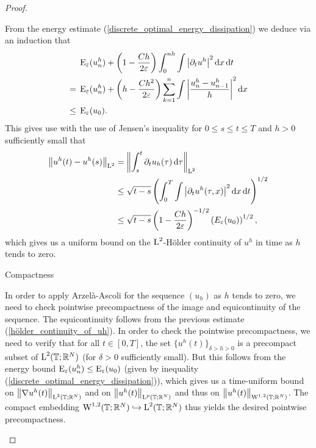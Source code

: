 \begin{proof}
\begin{description}[wide=0pt]
	From the energy estimate (\ref{discrete_optimal_energy_dissipation}) we deduce via an induction that
	\begin{align}
		& \operatorname{E}_{ \varepsilon } ( u_{ n }^{ h } )
		+
		\left(
			1
			-
			\frac{ C h  }{ 2 \varepsilon }
		\right)
		\int_{ 0 }^{ n h }
			\int
				\abs{ \partial_{ t } u^{ h } }^{ 2 }
			\dd{ x }
		\dd{ t }
		\notag
		\\
		={} &
		\operatorname{E}_{ \varepsilon } ( u_{ n }^{ h } )
		+
		\left(
			h - \frac{ C h^{ 2 }}{ 2 \varepsilon }
		\right)
		\sum_{k = 1 }^{ n }
			\int
				 \abs{
				 	\frac{ u_{ n }^{ h } - u_{ n - 1 }^{ h } }{ h }
			 	}^{ 2 }
		 	\dd{ x }
		 \notag
		\\
		\label{energy_and_time_derivative_bound}
		\leq {} &
		\operatorname{E}_{ \varepsilon } ( u_{ 0 } ).
	\end{align}
	This gives use with the use of Jensen's inequality for $ 0\leq s \leq t \leq T $ and $ h > 0 $ sufficiently small that
	\begin{align}
		\norm{ u^{ h } ( t ) - u^{ h } ( s ) }_{ \operatorname{L}^{ 2 } }
		& =
		\norm{ 
			\int_{ s }^{ t }
				\partial_{ t } u_{ h } ( \tau )
			\dd{ \tau }
		}_{ \operatorname{L}^{ 2 } }
		\notag
		\\
		& \leq
		\sqrt{ t - s }
		\left(	
			\int_{ 0 }^{ T }
					\int
						\abs{ \partial_{ t } u^{ h } ( \tau, x ) }^{ 2 }
					\dd{ x }
				\dd{ t }
		\right)^{ 1/2 }
		\notag
		\\
		\label{hölder_continuity_of_uh}
		& \leq
		\sqrt{ t - s }
		\left(
			1 - \frac{ C h }{ 2 \varepsilon }
		\right)^{ - 1/2 }
		\left(  E_{ \varepsilon } ( u_{ 0 } ) \right)^{ 1/ 2 },
	\end{align}
	which gives us a uniform bound on the $ \operatorname{L}^{ 2 }$-Hölder continuity of $ u^{ h } $ in time as $ h $ tends to zero.
	
	\item[Step 5:] Compactness
	
	In order to apply Arzelà-Ascoli for the sequence $ (u_{ h } ) $ as $ h $ tends to zero, we need to check pointwise precompactness of the image and equicontinuity of the sequence. 
	The equicontinuity follows from the previous estimate (\ref{hölder_continuity_of_uh}).
	In order to check the pointwise precompactness, we need to verify that for all $ t \in [ 0 , T ] $, the set
	$ \{ u^{ h } ( t ) \}_{ \delta > h > 0 } $ is a precompact subset of $ \operatorname{L}^{ 2 } ( \operatorname{\mathbb{T}} ; \mathbb{ R }^{ N } ) $ (for $ \delta > 0 $ sufficiently small). 
	But this follows from the energy bound $ \operatorname{E}_{ \varepsilon } ( u_{ n }^{ h } ) \leq \operatorname{E}_{ \varepsilon } ( u_{ 0 } ) $ (given by inequality (\ref{discrete_optimal_energy_dissipation})), which gives us a time-uniform bound on $ \norm{ \nabla u^{ h }( t ) }_{\operatorname{L}^{ 2 }( \operatorname{\mathbb{T}}; \mathbb{ R }^{ N } ) } $ and on $ \norm{ u^{ h } ( t )}_{ \operatorname{L}^{ p } ( \operatorname{\mathbb{T}}; \mathbb{ R }^{ N } ) } $ and thus on $ \norm{ u^{ h } ( t )}_{ \operatorname{W}^{ 1 , 2 } ( \operatorname{\mathbb{T}}; \mathbb{ R }^{ N } ) } $. The compact embedding
	$ \operatorname{W}^{ 1 , 2 } ( \operatorname{\mathbb{T}} ; \mathbb{ R }^{ N } ) \hookrightarrow \operatorname{L}^{ 2 } ( \operatorname{\mathbb{T}}; \mathbb{ R }^{ N } ) $ thus yields the desired pointwise precompactness.
	

\end{description}
\end{proof}
